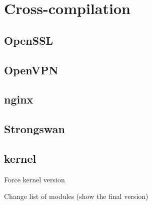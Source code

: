 \chapter{Cross-compilation}

\section{OpenSSL}

\section{OpenVPN}

\section{nginx}

\section{Strongswan}

\section{kernel}
Force kernel version

Change list of modules (show the final version)